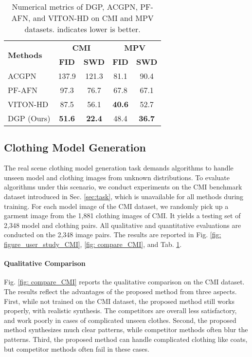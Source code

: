 \documentclass[10pt,twocolumn,letterpaper]{article}
\newcommand{\FID}{\textbf{FID}}  \newcommand{\PPL}{\textbf{PPL}}  \newcommand{\SSIM}{\textbf{SSIM}}  \newcommand{\SWD}{\textbf{SWD}}
\begin{document}
\begin{table}[t]
\caption{
    Numerical metrics of DGP, ACGPN, PF-AFN, and VITON-HD on CMI and MPV datasets.  indicates lower is better.
  }\label{tab:metrics}
  \centering
  \begin{tabular}{lcccc}
		\toprule
		\multirow{2}{*}{\textbf{Methods}} & \multicolumn{2}{c}{\textbf{CMI}} & \multicolumn{2}{c}{\textbf{MPV}} \\
		 \cmidrule(lr){2-3}\cmidrule(lr){4-5}& \FID & \SWD & \FID & \SWD\\
		\midrule
ACGPN&137.9 &121.3&81.1 &90.4\\
		PF-AFN &97.3&76.7&67.8&67.1\\
		VITON-HD &87.5&56.1&\textbf{40.6}&52.7\\
		DGP (Ours) &\textbf{51.6}&\textbf{22.4}&48.4&\textbf{36.7}\\


\bottomrule
	\end{tabular} \end{table}



\subsection{Clothing Model Generation}\label{sec:CMI}
The real scene clothing model generation task demands algorithms to handle unseen model and clothing images from unknown distributions. To evaluate algorithms under this scenario, we conduct experiments on the CMI benchmark dataset introduced in Sec. \ref{sec:task}, which is unavailable for all methods during training. For each model image of the CMI dataset, we randomly pick up a garment image from the 1,881 clothing images of CMI. It yields a testing set of 2,348 model and clothing pairs. All qualitative and quantitative evaluations are conducted on the 2,348 image pairs. The results are reported in Fig. \ref{fig: figure_user_study_CMI}, \ref{fig: compare_CMI}, and  Tab. \ref{tab:metrics}.


\paragraph{Qualitative Comparison} Fig. \ref{fig: compare_CMI} reports the qualitative comparison on the CMI dataset. The results reflect the advantages of the proposed method from three aspects. First, while not trained on the CMI dataset, the proposed method still works properly, with realistic synthesis. The competitors are overall less satisfactory, and work poorly in cases of complicated unseen clothes. Second, the proposed method synthesizes much clear patterns, while competitor methods often blur the patterns. Third, the proposed method can handle complicated clothing like coats, but competitor methods often fail in these cases.
\end{document}
